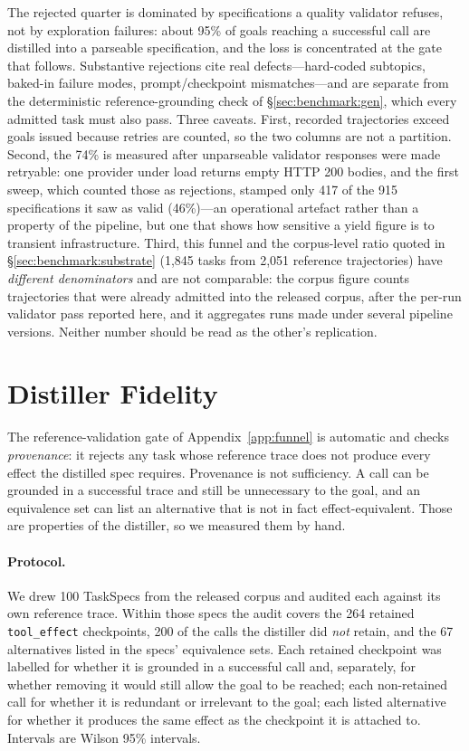 \noindent The rejected quarter is dominated by specifications a quality
validator refuses, not by exploration failures: about 95\% of goals reaching a
successful call are distilled into a parseable specification, and the loss is
concentrated at the gate that follows. Substantive rejections cite real
defects---hard-coded subtopics, baked-in failure modes, prompt/checkpoint
mismatches---and are separate from the deterministic reference-grounding check
of \S\ref{sec:benchmark:gen}, which every admitted task must also pass. Three
caveats. First, recorded trajectories exceed goals issued because retries are
counted, so the two columns are not a partition. Second, the 74\% is measured
after unparseable validator responses were made retryable: one provider under
load returns empty HTTP 200 bodies, and the first sweep, which counted those as
rejections, stamped only 417 of the 915 specifications it saw as valid
(46\%)---an operational artefact rather than a property of the pipeline, but one
that shows how sensitive a yield figure is to transient infrastructure.
Third, this
funnel and the corpus-level ratio quoted in \S\ref{sec:benchmark:substrate}
(1{,}845 tasks from 2{,}051 reference trajectories) have \emph{different
denominators} and are not comparable: the corpus figure counts trajectories
that were already admitted into the released corpus, after the per-run
validator pass reported here, and it aggregates runs made under several
pipeline versions. Neither number should be read as the other's replication.

\section{Distiller Fidelity}
\label{app:fidelity}
The reference-validation gate of Appendix~\ref{app:funnel} is automatic and
checks \emph{provenance}: it rejects any task whose reference trace does not
produce every effect the distilled spec requires. Provenance is not
sufficiency. A call can be grounded in a successful trace and still be
unnecessary to the goal, and an equivalence set can list an alternative that
is not in fact effect-equivalent. Those are properties of the distiller, so we
measured them by hand.

\paragraph{Protocol.} We drew 100 TaskSpecs from the released corpus and
audited each against its own reference trace. Within those specs the audit
covers the 264 retained \texttt{tool\_effect} checkpoints, 200 of the calls the
distiller did \emph{not} retain, and the 67 alternatives listed in the specs'
equivalence sets. Each retained checkpoint was labelled for whether it is
grounded in a successful call and, separately, for whether removing it would
still allow the goal to be reached; each non-retained call for whether it is
redundant or irrelevant to the goal; each listed alternative for whether it
produces the same effect as the checkpoint it is attached to. Intervals are
Wilson 95\% intervals.

